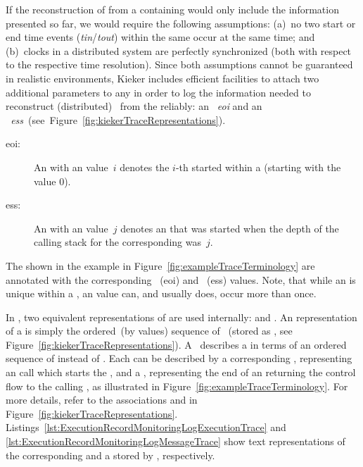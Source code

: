 If the reconstruction of \traces{} from a \MonitoringLog{} containing \KiekerExecutionRecords{} %
would only include the \trace{} information presented so far, we would require the %
following assumptions: %
(a)~no two \execution{} start or end time events %
(\textit{tin}/\textit{tout}) within the same \trace{} occur at the same time; %
and (b)~clocks in a distributed system are perfectly synchronized (both with %
respect to the respective time resolution). %
Since both assumptions cannot be guaranteed in realistic environments, %
Kieker includes efficient facilities to attach two additional parameters to any %
\KiekerExecutionRecord{} in order to log the information needed to %
reconstruct (distributed)~\traces{} from the \MonitoringLog{} reliably: %
an \textit{\eoiLong{}~eoi} and an \textit{\essLong{}~ess}~(see~Figure~\ref{fig:kiekerTraceRepresentations}). %
\begin{description}
\item[eoi:] An \execution{} with an \eoiLong{} value~$i$ denotes the $i$-th %
\execution{} started within a \trace{} (starting with the value $0$).
\item[ess:] An \execution{} with an \essLong{} value~$j$ denotes an \execution{} that %
was started when the depth of the calling stack for the corresponding \trace{} was~$j$.
\end{description}

\noindent The \executions{} shown in the example \trace{} in Figure~\ref{fig:exampleTraceTerminology} 
are annotated with the corresponding \eoiLong{}~(eoi) and \essLong{}~(ess) values. %
Note, that while an \eoiLong{} is unique within a \trace{}, an \essLong{} %
value can, and usually does, occur more than once. %

In \KiekerTpan{}, two equivalent representations of \traces{} are used internally: %
\executionTraces{} and \messageTraces{}. %
An \executionTrace{} representation of a \trace{} is simply the ordered~(by %
\eoiLong{} values) sequence of \executions{}~(stored as \KiekerExecutionRecords{}, see Figure~\ref{fig:kiekerTraceRepresentations}). %
A~\messageTrace{} describes a \trace{} in terms of an ordered sequence of \Messages{} %
instead of \executions{}. %
Each \execution{} can be described by a corresponding \callMessage{}, %
representing an \operation{} call which starts the \execution{}, %
and a \returnMessage{}, representing the end of an \execution{} returning the %
control flow to the calling \execution{}, as illustrated in Figure~\ref{fig:exampleTraceTerminology}. %
For more details, refer to the associations \sender{} and \receiver{} in Figure~\ref{fig:kiekerTraceRepresentations}.
Listings~\ref{lst:ExecutionRecordMonitoringLogExecutionTrace} and \ref{lst:ExecutionRecordMonitoringLogMessageTrace} %
show text representations of the corresponding \executionTrace{} and a \messageTrace{} stored by \KiekerTpan{}, respectively.

